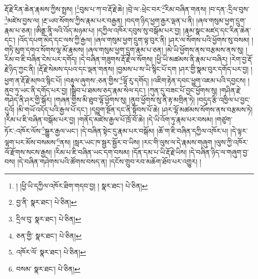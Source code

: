 རྡོ་རྗེ་རིན་ཆེན་རྣམས་ཀྱིས་སྤྲས། །\footnote{། །ཕྱི་ཡི་དཀྱིལ་འཁོར་ཐིག་གདབ་བྱ། །  སྣར་ཐང་།  པེ་ཅིན། }བུམ་པ་ཀ་བ་རྡོ་རྗེ་ཆེ། །བྲེ་ལ་:ཕྲེང་བར་\footnote{བྱ་ནི་  སྣར་ཐང་།  པེ་ཅིན། }རིམ་བཞིན་གནས། །བ་དན་:དྲིལ་བུས་\footnote{དྲིལ་བུ་  སྣར་ཐང་།  པེ་ཅིན། }མཛེས་བྱས་ལ། །རྔ་ཡབ་སོགས་ཀྱིས་རྣམ་པར་བརྒྱན། །བདག་ཉིད་ཕྱག་རྒྱར་ལྡན་པ་ནི། །ཞལ་གསུམ་ཕྱག་དྲུག་རྣམ་པ་ཅན། །ཨིནྡྲ་ནཱི་ལའི་འོད་མཉམ་པ། །དཀྱིལ་འཁོར་དབུས་སུ་བསྒོམ་པར་བྱ། །རྣམ་སྣང་མཛད་དང་རིན་ཆེན་དང་། །འོད་དཔག་མེད་དང་ལས་ཀྱི་རྒྱལ། །ཞལ་གསུམ་ཕྱག་དྲུག་ལྟ་བུར་ནི། །ཤར་ལ་སོགས་པའི་ཕྱོགས་སུ་བསམ། །གཏི་མུག་དགའ་སོགས་ལྷ་མོ་རྣམས། །ཞལ་གསུམ་ཕྱག་དྲུག་རྣམ་པ་ཅན། །མེ་ཡི་ཕྱོགས་ནས་བརྩམས་ནས་སུ། །རིམ་བ་ཇི་བཞིན་ངེས་པར་དགོད། །དེ་བཞིན་གཟུགས་རྡོ་རྗེ་ལ་སོགས། །ཕྱི་ཡི་མཚམས་ནི་རྣམ་པ་བཞིར། །རེག་བྱ་རྡོ་རྗེ་ཉིད་ཀྱང་ནི། །རྡོ་རྗེ་སེམས་དཔའ་དང་ལྡན་གནས། །བྱམས་པ་ས་ཡི་སྙིང་པོ་དག །ཤར་གྱི་སྣམ་བུར་དགོད་པར་བྱ། །ཕྱག་ན་རྡོ་རྗེ་མཁའ་སྙིང་པོ། །བརྟུལ་ཞུགས་:ཅན་གྱིས་\footnote{ཅན་གྱི་  སྣར་ཐང་།  པེ་ཅིན། }ལྷོ་རུ་དགོད། །འཇིག་རྟེན་དབང་ཕྱུག་འཇམ་པའི་དབྱངས། །ནུབ་ཏུ་ཡང་ནི་དགོད་པར་བྱ། །སྒྲིབ་པ་ཐམས་ཅད་རྣམ་སེལ་དང་། །ཀུན་དུ་བཟང་པོ་བྱང་ཕྱོགས་སུ། །གཤིན་རྗེ་གཤེད་ནི་ཤར་གྱི་སྒོར། །གཞན་གྱིས་མི་ཐུབ་ལྷོ་ཕྱོགས་སུ། །ནུབ་ཕྱོགས་སུ་ནི་རྟ་མགྲིན་ཏེ། །བདུད་རྩི་འཁྱིལ་པ་བྱང་དུའོ། །མི་གཡོ་འདོད་པའི་རྒྱལ་པོ་དང་། །དབྱུག་སྔོན་དང་ནི་སྟོབས་པོ་ཆེ། །ཤར་ལྷོ་མཚམས་སོགས་ནས་བརྩམས་ཏེ། །རིམ་པ་ཇི་བཞིན་བསྒོམ་པར་བྱ། །གནོད་མཛེས་རྒྱལ་པོ་ཁྲོ་བོ་ཆེ། །དེ་ཡི་འོག་ཏུ་རྣམ་པར་བསམ། །གཙུག་ཏོར་:འཁོར་ལོས་\footnote{འཁོར་ལོ་  སྣར་ཐང་།  པེ་ཅིན། }སྒྱུར་རྒྱལ་ཡང་། །དེ་བཞིན་སྟེང་དུ་རྣམ་པར་བསྒོམ། །ཆོ་ག་ཇི་བཞིན་དཀྱིལ་འཁོར་པ། །དེ་ལྟར་ལྷག་པར་མོས་བསམས་\footnote{བསམ་  སྣར་ཐང་།  པེ་ཅིན། }ནས། །སླར་ཡང་ཁ་སྦྱར་སྦྱོར་བ་ཡིས། །རང་གི་ལུས་ལ་དེ་རྣམས་གཞུག །ལུས་ཀྱི་འཁོར་ལོ་རྫོགས་སངས་རྒྱས། །རིམ་པ་ཇི་བཞིན་ཡང་དག་བསམ། །དོན་དམ་པ་ཡི་རྡོ་རྗེ་ཡིས། །དེ་བཞིན་ཉིད་ལ་གཞུག་བྱ་བས། །དེ་བཞིན་གཤེགས་པའི་ཚོགས་བསད་ན། །དངོས་གྲུབ་རབ་མཆོག་ཐོབ་པར་འགྱུར། །
